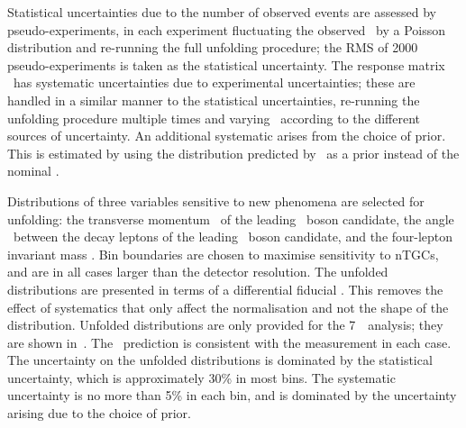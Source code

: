 Statistical uncertainties due to the number of observed events are assessed by
pseudo-experiments, in each experiment fluctuating the observed \unfy\ by a
Poisson distribution and re-running the full unfolding procedure; the RMS of 2000
pseudo-experiments is taken as the statistical uncertainty. 
The response matrix \unfA\ has systematic uncertainties due to experimental
uncertainties; these are handled in a similar manner to the statistical
uncertainties, re-running the unfolding procedure multiple times and varying 
\unfA\ according to the different sources of uncertainty. An
additional systematic arises from the choice of prior. This is estimated by
using the distribution predicted by \sherpa\ as a prior instead of the nominal
\powhegbox. 

Distributions of three variables sensitive to new phenomena are selected for
unfolding: the transverse momentum \ptZ\ of the leading \Z\ boson candidate, the
angle \deltaPhiLL\ between the decay leptons of the leading \Z\ boson candidate,
and the four-lepton invariant mass \mZZ. Bin boundaries are chosen to maximise
sensitivity to nTGCs, and are in all cases larger than the detector resolution.
The unfolded distributions are presented in terms of a differential fiducial
\cx. This removes the effect of systematics that only affect the normalisation
and not the shape of the distribution. Unfolded distributions are only provided
for the 7~\tev\ analysis; they are shown in~.  The
\sm\ prediction is consistent with the measurement in each case. The
uncertainty on the unfolded distributions is dominated by the statistical
uncertainty, which is approximately 30\% in most bins. The systematic
uncertainty is no more than 5\% in each bin, and is dominated by the
uncertainty arising due to the choice of prior.

